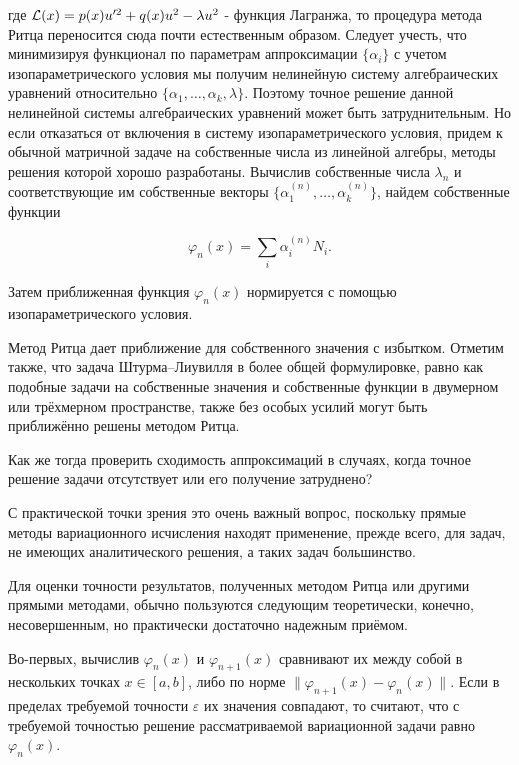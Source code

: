\documentclass{article}
\begin{document}
\noindent где $\mathcal{L}(x) = p(x)u'^{2} + q(x)u^{2} - \lambda u^{2}$ - функция Лагранжа, то процедура метода Ритца переносится сюда почти естественным образом. Следует учесть, что минимизируя функционал по параметрам аппроксимации $\{\alpha_{i}\}$ с учетом изопараметрического условия мы получим нелинейную систему алгебраических уравнений относительно $\{\alpha_{1}, \dots, \alpha_{k}, \lambda\}$. Поэтому точное решение данной нелинейной системы алгебраических уравнений может быть затруднительным. Но если отказаться от включения в систему изопараметрического условия, придем к обычной матричной задаче на собственные числа из линейной алгебры, методы решения которой хорошо разработаны. Вычислив собственные числа $\lambda_{n}$ и соответствующие им собственные векторы $\{\alpha_{1}^{(n)}, \dots, \alpha_{k}^{(n)}\}$, найдем собственные функции

\begin{displaymath}
	\varphi_{n}(x) = \sum_{i}^{} \alpha_{i}^{(n)} N_{i}. 
\end{displaymath}

\noindent Затем приближенная функция $\varphi_{n}(x)$ нормируется с помощью изопараметрического условия.

\begin{info}
	Метод Ритца дает приближение для собственного значения с избытком. Отметим также, что задача Штурма–Лиувилля в более общей формулировке, равно как подобные задачи на собственные значения и собственные функции в двумерном или трёхмерном пространстве, также без особых усилий могут быть приближённо решены методом Ритца.
\end{info}

\begin{question}
	Как же тогда проверить сходимость аппроксимаций в случаях, когда точное решение задачи отсутствует или его получение затруднено?
\end{question}

С практической точки зрения это очень важный вопрос, поскольку прямые методы вариационного исчисления находят применение, прежде всего, для задач, не имеющих аналитического решения, а таких задач большинство.

Для оценки точности результатов, полученных методом Ритца или другими прямыми методами, обычно пользуются следующим теоретически, конечно, несовершенным, но практически достаточно надежным приёмом.

Во-первых, вычислив $\varphi_{n}(x)$ и $\varphi_{n+1}(x)$ сравнивают их между собой в нескольких точках $ x \in \left[a, b\right] $, либо по норме $ \parallel\varphi_{n+1}(x) - \varphi_{n}(x)\parallel$. Если в пределах требуемой точности $ \varepsilon $ их значения совпадают, то считают, что с требуемой точностью решение рассматриваемой вариационной задачи равно $ \varphi_{n}(x) $.
\end{document}
